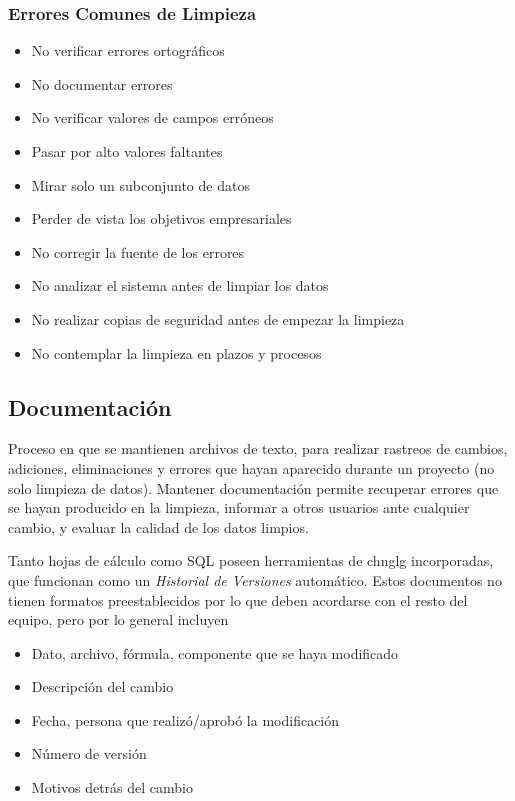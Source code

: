 \subsubsection{Errores Comunes de Limpieza}
\begin{itemize}
    \item {No verificar errores ortográficos}
    \item {No documentar errores}
    \item {No verificar valores de campos erróneos}
    \item {Pasar por alto valores faltantes}
    \item {Mirar solo un subconjunto de datos}
    \item {Perder de vista los objetivos empresariales}
    \item {No corregir la fuente de los errores}
    \item {No analizar el sistema antes de limpiar los datos}
    \item {No realizar copias de seguridad antes de empezar la limpieza}
    \item {No contemplar la limpieza en plazos y procesos}
\end{itemize}

\subsection{Documentación}
Proceso en que se mantienen archivos de texto, para realizar rastreos de cambios, adiciones, eliminaciones y errores que hayan aparecido durante un proyecto (no solo limpieza de datos). Mantener documentación permite recuperar errores que se hayan producido en la limpieza, informar a otros usuarios ante cualquier cambio, y evaluar la calidad de los datos limpios. 

Tanto hojas de cálculo como SQL poseen herramientas de \gls{chnglg} incorporadas, que funcionan como un \textit{Historial de Versiones} automático. Estos documentos no tienen formatos preestablecidos por lo que deben acordarse con el resto del equipo, pero por lo general incluyen
\begin{itemize}
    \item {Dato, archivo, fórmula, componente que se haya modificado}
    \item {Descripción del cambio}
    \item {Fecha, persona que realizó/aprobó la modificación}
    \item {Número de versión}
    \item {Motivos detrás del cambio}
\end{itemize}

\newpage